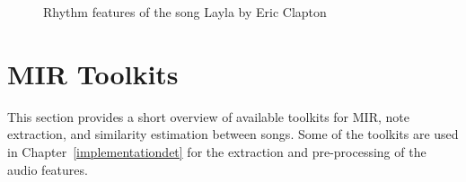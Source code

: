 \FloatBarrier
\begin{figure}[htbp]
	\centering
	\caption{Rhythm features of the song Layla by Eric Clapton}
	\label{fig:feat2}
\end{figure}
\FloatBarrier

\section{MIR Toolkits}\label{mirtoolkit}

This section provides a short overview of available toolkits for MIR, note extraction, and similarity estimation between songs. Some of the toolkits are used in Chapter~\ref{implementationdet} for the extraction and pre-processing of the audio features.

